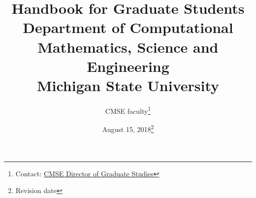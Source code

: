\documentclass[12pt]{article}
\begin{document}
\vspace{-50mm}
\title{Handbook for Graduate Students\\
\vspace{20mm}
  \large Department of Computational Mathematics, Science and
  Engineering\\
\vspace{20mm}
Michigan State University
\vspace{50mm}
}

\author{CMSE faculty\footnote{Contact:
    \href{mailto:cmsegrad@msu.edu}{CMSE Director of Graduate Studies}
  }}

\date{August 15, 2018\footnote{Revision date}}

\maketitle

\newpage

\tableofcontents

\newpage



\newpage



\newpage



\newpage



\newpage



\newpage



\newpage



\newpage



\newpage



\newpage



\newpage



\newpage



\newpage



\newpage

\appendix



\newpage



\newpage


\end{document}
